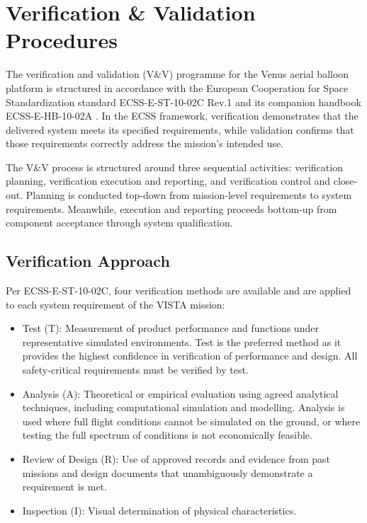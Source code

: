 \chapter{Verification \& Validation Procedures}

The verification and validation (V\&V) programme for the Venus aerial balloon platform is structured in accordance with the European Cooperation for Space Standardization standard ECSS-E-ST-10-02C Rev.1 \cite{ECSS_VER} and its companion handbook ECSS-E-HB-10-02A \cite{ECSS_HB}. In the ECSS framework, verification demonstrates that the delivered system meets its specified requirements, while validation confirms that those requirements correctly address the mission's intended use. 

The V\&V process is structured around three sequential activities: verification planning, verification execution and reporting, and verification control and close-out. Planning is conducted top-down from mission-level requirements to system requirements. Meanwhile, execution and reporting proceeds bottom-up from component acceptance through system qualification. 

\section{Verification Approach}

Per ECSS-E-ST-10-02C, four verification methods are available and are applied to each system requirement of the VISTA mission:

\begin{itemize}[itemsep=1pt, parsep=1pt]
    \item Test (T): Measurement of product performance and functions under representative simulated environments. Test is the preferred method as it provides the highest confidence in verification of performance and design. All safety-critical requirements must be verified by test.
    \item Analysis (A): Theoretical or empirical evaluation using agreed analytical techniques, including computational simulation and modelling. Analysis is used where full flight conditions cannot be simulated on the ground, or where testing the full spectrum of conditions is not economically feasible.
    \item Review of Design (R): Use of approved records and evidence from past missions and design documents that unambiguously demonstrate a requirement is met.
    \item Inspection (I): Visual determination of physical characteristics. 
\end{itemize}

